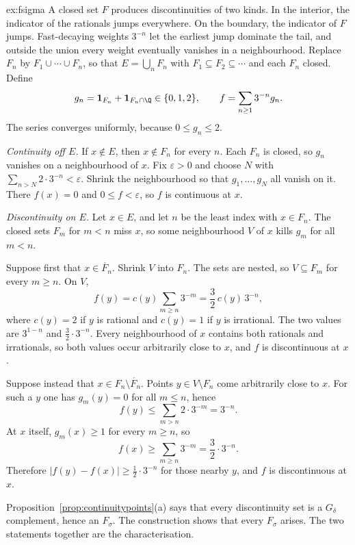\begin{solution}{ex:fsigma}
\idea A closed set $F$ produces discontinuities of two kinds. In the interior, the indicator of the rationals jumps everywhere. On the boundary, the indicator of $F$ jumps. Fast-decaying weights $3^{-n}$ let the earliest jump dominate the tail, and outside the union every weight eventually vanishes in a neighbourhood.
\writeup Replace $F_n$ by $F_1\cup\cdots\cup F_n$, so that $E=\bigcup_n F_n$ with $F_1\subseteq F_2\subseteq\cdots$ and each $F_n$ closed. Define
\[g_n=\mathbf 1_{F_n}+\mathbf 1_{F_n\cap\Q}\in\{0,1,2\},\qquad f=\sum_{n\ge1}3^{-n}g_n.\]
The series converges uniformly, because $0\le g_n\le2$.

\emph{Continuity off $E$.} If $x\notin E$, then $x\notin F_n$ for every $n$. Each $F_n$ is closed, so $g_n$ vanishes on a neighbourhood of $x$. Fix $\varepsilon>0$ and choose $N$ with $\sum_{n>N}2\cdot3^{-n}<\varepsilon$. Shrink the neighbourhood so that $g_1,\dots,g_N$ all vanish on it. There $f(x)=0$ and $0\le f<\varepsilon$, so $f$ is continuous at $x$.

\emph{Discontinuity on $E$.} Let $x\in E$, and let $n$ be the least index with $x\in F_n$. The closed sets $F_m$ for $m<n$ miss $x$, so some neighbourhood $V$ of $x$ kills $g_m$ for all $m<n$.

Suppose first that $x\in\mathring{F_n}$. Shrink $V$ into $F_n$. The sets are nested, so $V\subseteq F_m$ for every $m\ge n$. On $V$,
\[f(y)=c(y)\sum_{m\ge n}3^{-m}=\frac32\,c(y)\,3^{-n},\]
where $c(y)=2$ if $y$ is rational and $c(y)=1$ if $y$ is irrational. The two values are $3^{1-n}$ and $\frac32\cdot3^{-n}$. Every neighbourhood of $x$ contains both rationals and irrationals, so both values occur arbitrarily close to $x$, and $f$ is discontinuous at $x$.

Suppose instead that $x\in F_n\setminus\mathring{F_n}$. Points $y\in V\setminus F_n$ come arbitrarily close to $x$. For such a $y$ one has $g_m(y)=0$ for all $m\le n$, hence
\[f(y)\le\sum_{m>n}2\cdot3^{-m}=3^{-n}.\]
At $x$ itself, $g_m(x)\ge1$ for every $m\ge n$, so
\[f(x)\ge\sum_{m\ge n}3^{-m}=\frac32\cdot3^{-n}.\]
Therefore $|f(y)-f(x)|\ge\frac12\cdot3^{-n}$ for those nearby $y$, and $f$ is discontinuous at $x$.

Proposition~\ref{prop:continuitypoints}(a) says that every discontinuity set is a $G_\delta$ complement, hence an $F_\sigma$. The construction shows that every $F_\sigma$ arises. The two statements together are the characterisation.
\end{solution}

